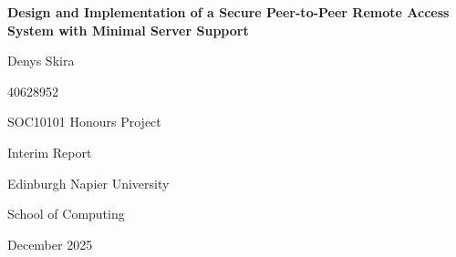 \documentclass[12pt,a4paper]{article}
\begin{document}

\begin{titlepage}

\centering

\vspace*{2cm}

{\Large \textbf{Design and Implementation of a Secure Peer-to-Peer Remote Access System with Minimal Server Support}}

\vspace{1.5cm}

{\large Denys Skira}

{\large 40628952}

\vspace{1.5cm}

{\large SOC10101 Honours Project}

{\large Interim Report}

\vspace{\fill}

{\large Edinburgh Napier University}

{\large School of Computing}

{\large December 2025}

\end{titlepage}

\pagebreak


\begin{abstract}

This interim report documents the progress of initial research and prototype development for a secure peer-to-peer (P2P) remote access system designed for minimal server dependency. During the project research and development, I explore the viability of an alternative architecture to commercial cloud-based solutions such as TeamViewer and AnyDesk. The focus of this project is on addressing privacy erosion, censorship vulnerability and operational dependency concerns. The report contains a literature review of relevant protocols and technologies, justification of the technical stack selection, description of the current system architecture and a roadmap for future development. The prototype successfully establishes encrypted peer-to-peer connections within local networks.

\end{abstract}\pagebreak

\tableofcontents
\newpage

\listoffigures
\end{document}

